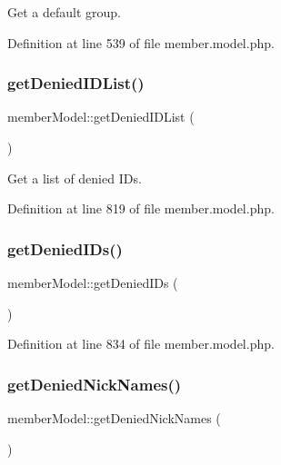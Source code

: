 Get a default group. 



Definition at line 539 of file member.\+model.\+php.

\hypertarget{classmemberModel_ad6bb73cc72412955c289f4f695b8d0c9}{}\label{classmemberModel_ad6bb73cc72412955c289f4f695b8d0c9} 
\subsubsection{\texorpdfstring{get\+Denied\+I\+D\+List()}{getDeniedIDList()}}
{\footnotesize\ttfamily member\+Model\+::get\+Denied\+I\+D\+List (\begin{DoxyParamCaption}{ }\end{DoxyParamCaption})}



Get a list of denied I\+Ds. 



Definition at line 819 of file member.\+model.\+php.

\hypertarget{classmemberModel_af8bd4c178bbae831f02b5419bc0e02ea}{}\label{classmemberModel_af8bd4c178bbae831f02b5419bc0e02ea} 
\subsubsection{\texorpdfstring{get\+Denied\+I\+Ds()}{getDeniedIDs()}}
{\footnotesize\ttfamily member\+Model\+::get\+Denied\+I\+Ds (\begin{DoxyParamCaption}{ }\end{DoxyParamCaption})}



Definition at line 834 of file member.\+model.\+php.

\hypertarget{classmemberModel_ac318ffed61009f4b2d993daee7788072}{}\label{classmemberModel_ac318ffed61009f4b2d993daee7788072} 
\subsubsection{\texorpdfstring{get\+Denied\+Nick\+Names()}{getDeniedNickNames()}}
{\footnotesize\ttfamily member\+Model\+::get\+Denied\+Nick\+Names (\begin{DoxyParamCaption}{ }\end{DoxyParamCaption})}



